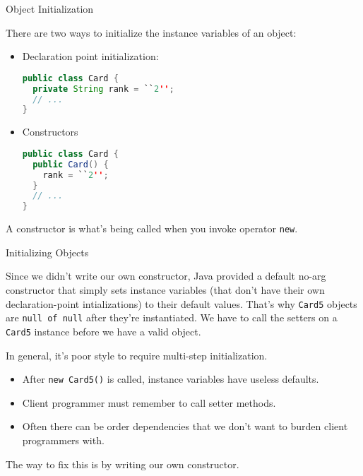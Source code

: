 \documentclass{beamer}
\begin{document}
\begin{frame}[fragile]{Object Initialization}


There are two ways to initialize the instance variables of an object:
\begin{itemize}
\item Declaration point initialization:
\begin{lstlisting}[language=Java,mathescape=true]
public class Card {
  private String rank = ``2'';
  // ...
}
\end{lstlisting}
\item Constructors
\begin{lstlisting}[language=Java,mathescape=true]
public class Card {
  public Card() {
    rank = ``2'';
  }
  // ...
}
\end{lstlisting}

\end{itemize}
A constructor is what's being called when you invoke operator {\tt new}.
\end{frame}

\begin{frame}[fragile]{Initializing Objects}


Since we didn't write our own constructor, Java provided a default no-arg constructor that simply sets instance variables (that don't have their own declaration-point intializations) to their default values.  That's why {\tt Card5} objects are {\tt null of null} after they're instantiated.  We have to call the setters on a {\tt Card5} instance before we have a valid object.\\
\vspace{.1in}

In general, it's poor style to require multi-step initialization.
\begin{itemize}
\item After {\tt new Card5()} is called, instance variables have useless defaults.
\item Client programmer must remember to call setter methods.
\item Often there can be order dependencies that we don't want to burden client programmers with.
\end{itemize}
The way to fix this is by writing our own constructor.

\end{frame}
\end{document}
